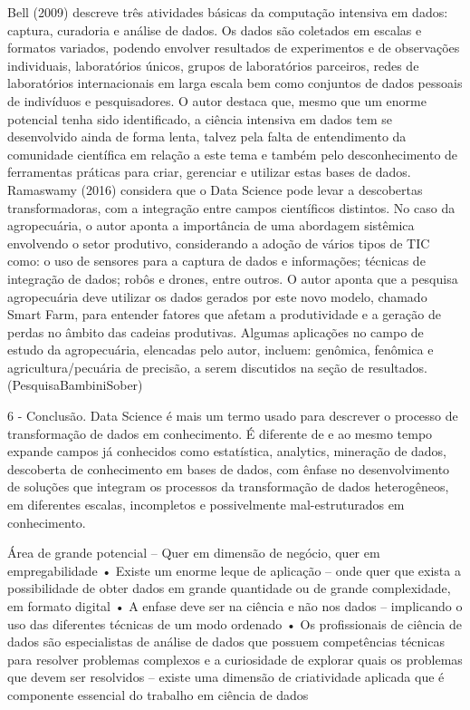 Bell (2009) descreve três atividades básicas da computação intensiva em dados: captura, curadoria e análise de dados. Os dados são coletados em escalas e formatos variados, podendo envolver resultados de experimentos e de observações individuais, laboratórios únicos, grupos de laboratórios parceiros, redes de laboratórios internacionais em larga escala bem como conjuntos de dados pessoais de indivíduos e pesquisadores. O autor destaca que, mesmo que um enorme potencial tenha sido identificado, a ciência intensiva em dados tem se desenvolvido ainda de forma lenta, talvez pela falta de entendimento da comunidade científica em relação a este tema e também pelo desconhecimento de ferramentas práticas para criar, gerenciar e utilizar estas bases de dados. Ramaswamy (2016) considera que o Data Science pode levar a descobertas transformadoras, com a integração entre campos científicos distintos. No caso da agropecuária, o autor aponta a importância de uma abordagem sistêmica envolvendo o setor produtivo, considerando a adoção de vários tipos de TIC como: o uso de sensores para a captura de dados e informações; técnicas de integração de dados; robôs e drones, entre outros. O autor aponta que  a pesquisa agropecuária deve utilizar os dados gerados por este novo modelo, chamado Smart Farm, para entender fatores que afetam a produtividade e a geração de perdas no âmbito das cadeias produtivas. Algumas aplicações no campo de estudo da agropecuária, elencadas pelo autor, incluem: genômica, fenômica e agricultura/pecuária de precisão, a serem discutidos na seção de resultados. (PesquisaBambiniSober)


6 - Conclusão.
   Data Science é mais um termo usado para descrever o processo de transformação de dados em conhecimento. É diferente de e ao mesmo tempo expande campos já conhecidos como estatística, analytics, mineração de dados, descoberta de conhecimento em bases de dados, com ênfase no desenvolvimento de soluções que integram os processos da transformação de dados heterogêneos, em diferentes escalas, incompletos e possivelmente mal-estruturados em conhecimento.  
 
 Área de grande potencial – Quer em dimensão de negócio, quer em empregabilidade • Existe um enorme leque de aplicação – onde quer que exista a possibilidade de obter dados em grande quantidade ou de grande complexidade, em formato digital • A enfase deve ser na ciência e não nos dados – implicando o uso das diferentes técnicas de um modo ordenado • Os profissionais de ciência de dados são especialistas de análise de dados que possuem competências técnicas para resolver problemas complexos e a curiosidade de explorar quais os problemas que devem ser resolvidos – existe uma dimensão de criatividade aplicada que é componente essencial do trabalho em ciência de dados


